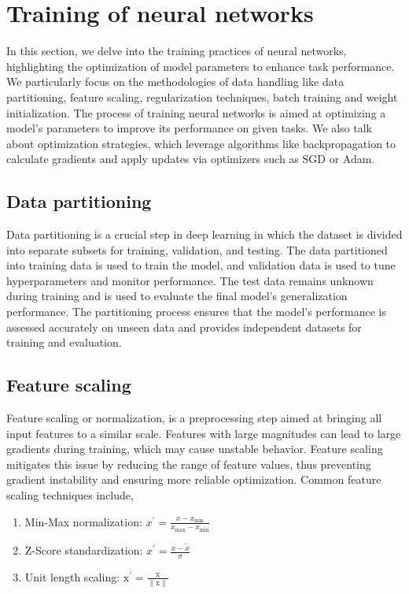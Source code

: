 \section{Training of neural networks}\label{optrain}
In this section, we delve into the training practices of neural networks, highlighting the optimization of model parameters to enhance task performance. We particularly focus on the methodologies of data handling like data partitioning, feature scaling, regularization techniques, batch training and weight initialization.
The process of training neural networks is aimed at optimizing a model's parameters to improve its performance on given tasks. We also talk about optimization strategies, which leverage algorithms like backpropagation to calculate gradients and apply updates via optimizers such as SGD or Adam.
\subsection{Data partitioning}Data partitioning is a crucial step in deep learning in which the dataset is divided into separate subsets for training, validation, and testing. The data partitioned into training data is used to train the model, and validation data is used to tune hyperparameters and monitor performance. The test data remains unknown during training and is used to evaluate the final model's generalization performance. The partitioning process ensures that the model's performance is assessed accurately on unseen data and provides independent datasets for training and evaluation. 
\subsection{Feature scaling}Feature scaling or normalization, is a preprocessing step aimed at bringing all input features to a similar scale. Features with large magnitudes can lead to large gradients during training, which may cause unstable behavior. Feature scaling mitigates this issue by reducing the range of feature values, thus preventing gradient instability and ensuring more reliable optimization. Common feature scaling techniques include,
\begin{enumerate}
\item Min-Max normalization: $x^{\prime}=\frac{x-x_{\min }}{x_{\max }-x_{\min }}$
\item Z-Score standardization: $x^{\prime}=\frac{x-\tilde{x}}{\sigma}$
\item Unit length scaling: $\mathrm{x}^{\prime}=\frac{\mathrm{x}}{\|\mathrm{x}\|}$
\end{enumerate}

